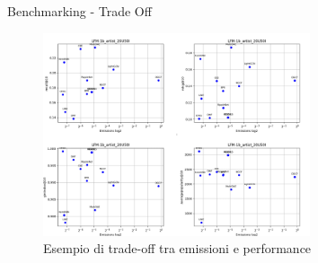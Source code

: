 \begin{frame}{Benchmarking - Trade Off}
    \begin{figure}[H]
    \centering
    \includegraphics[height=0.7\textheight, width=0.7\textwidth]{images/TradeOff.png}
    \caption{Esempio di trade-off tra emissioni e performance}
\end{figure}
\end{frame}


